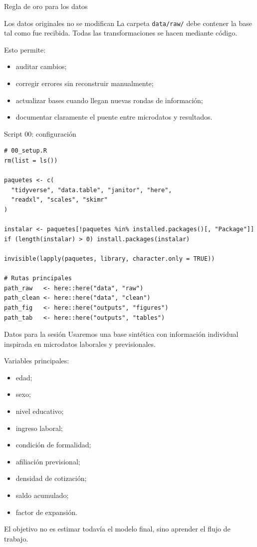 \documentclass[aspectratio=169,11pt]{beamer}
\begin{document}
\begin{frame}{Regla de oro para los datos}
\begin{block}{Los datos originales no se modifican}
La carpeta \texttt{data/raw/} debe contener la base tal como fue recibida. Todas las transformaciones se hacen mediante código.
\end{block}

\vspace{0.3cm}
Esto permite:
\begin{itemize}
  \item auditar cambios;
  \item corregir errores sin reconstruir manualmente;
  \item actualizar bases cuando llegan nuevas rondas de información;
  \item documentar claramente el puente entre microdatos y resultados.
\end{itemize}
\end{frame}

\begin{frame}[fragile]{Script 00: configuración}
\begin{lstlisting}
# 00_setup.R
rm(list = ls())

paquetes <- c(
  "tidyverse", "data.table", "janitor", "here",
  "readxl", "scales", "skimr"
)

instalar <- paquetes[!paquetes %in% installed.packages()[, "Package"]]
if (length(instalar) > 0) install.packages(instalar)

invisible(lapply(paquetes, library, character.only = TRUE))

# Rutas principales
path_raw   <- here::here("data", "raw")
path_clean <- here::here("data", "clean")
path_fig   <- here::here("outputs", "figures")
path_tab   <- here::here("outputs", "tables")
\end{lstlisting}
\end{frame}

\begin{frame}{Datos para la sesión}
Usaremos una base sintética con información individual inspirada en microdatos laborales y previsionales.

\vspace{0.3cm}
Variables principales:
\begin{itemize}
  \item edad;
  \item sexo;
  \item nivel educativo;
  \item ingreso laboral;
  \item condición de formalidad;
  \item afiliación previsional;
  \item densidad de cotización;
  \item saldo acumulado;
  \item factor de expansión.
\end{itemize}

\vspace{0.2cm}
El objetivo no es estimar todavía el modelo final, sino aprender el flujo de trabajo.
\end{frame}
\end{document}
